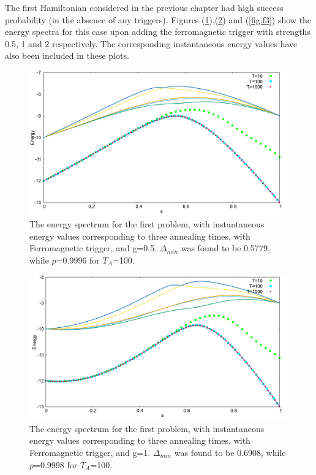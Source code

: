 \documentclass[12]{article}
\begin{document}
The first Hamiltonian considered in the previous chapter had high success probability (in the absence of any triggers). Figures (\ref{fig:f1}),(\ref{fig:f2}) and (\ref{fig:f3}) show the energy spectra for this case upon adding the ferromagnetic trigger with strengths 0.5, 1 and 2 respectively. The corresponding instantaneous energy values have also been included in these plots. 
\begin{figure}[H]
\centering 
\includegraphics[scale=0.3]{733_s12_F_g0.png}
\caption{The energy spectrum for the first problem, with instantaneous energy values corresponding to three annealing times, with Ferromagnetic trigger, and g=0.5. $\Delta_{min}$ was found to be 0.5779, while $p$=0.9996 for $T_A$=100. }
\label{fig:f1}
\end{figure}
\begin{figure}[H]
\centering 
\includegraphics[scale=0.3]{733_s12_F_g1.png}
\caption{The energy spectrum for the first problem, with instantaneous energy values corresponding to three annealing times, with Ferromagnetic trigger, and g=1. $\Delta_{min}$ was found to be 0.6908, while $p$=0.9998 for $T_A$=100.}
\label{fig:f2}
\end{figure}
\end{document}
